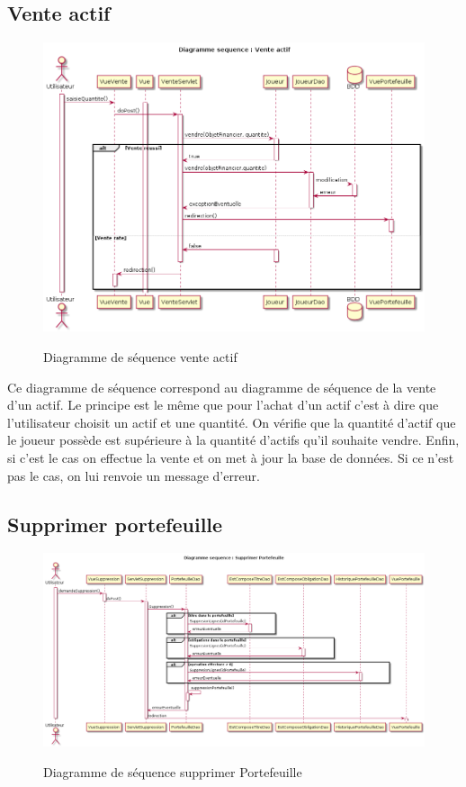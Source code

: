 \subsection{Vente actif}
\begin{figure}[H]
  \center
  \includegraphics[scale=0.35]{../graph/DiagrammeSequenceVenteActif.png} \\
  \caption{Diagramme de séquence vente actif}
\end{figure}

Ce diagramme de séquence correspond au diagramme de séquence de la vente d'un actif. Le principe est le même que pour l'achat d'un actif c'est à dire que l'utilisateur choisit un actif et une quantité. On vérifie que la quantité d'actif que le joueur possède est supérieure à la quantité d'actifs qu'il souhaite vendre. Enfin, si c'est le cas on effectue la vente et on met à jour la base de données. Si ce n'est pas le cas, on lui renvoie un message d'erreur.  

\subsection{Supprimer portefeuille}
\begin{figure}[H]
  \center
  \includegraphics[scale=0.3]{../graph/DiagrammeSequenceSupprimerPortefeuille.png} \\
  \caption{Diagramme de séquence supprimer Portefeuille}
\end{figure}

